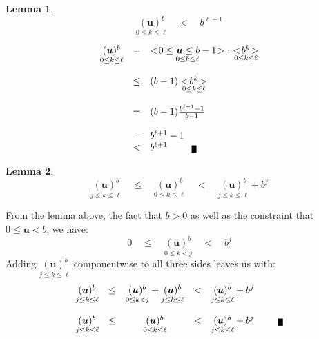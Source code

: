 \documentclass[twoside]{article}
\newcommand{\underseq}[2][u]{\ensuremath{\underset{#2}{<\!#1\!>}}}
\newcommand{\bradixp}[3][u]{\ensuremath{\underset{#2}{(\bm{#1})^{#3}}}}
\newtheorem{lemma}{Lemma}[section]
\newenvironment{proof}[1][Proof]{\begin{trivlist}
\item[\hskip \labelsep {\bfseries #1}]}{\end{trivlist}}
\newcommand{\qed}{\nobreak \ifvmode \relax \else
      \ifdim\lastskip<1.5em \hskip-\lastskip
      \hskip1.5em plus0em minus0.5em \fi \nobreak
      \vrule height0.5em width0.5em depth0.25em\fi}
\begin{document}
\begin{lemma}
\color{blue}
$$ \bradixp{0\le k\le\ell}{b}\quad <\quad b^{\ell+1} $$
\end{lemma}

\begin{proof}
$$ \begin{array}{rcl}
\bradixp{0\le k\le\ell}{b}
	& = &	\underseq[0\le\bm{u}\le b-1]{0\le k\le\ell}\cdot\underseq[b^k]{0\le k\le\ell}	\\
												\\
	& \le &	(b-1)\underseq[b^k]{0\le k\le\ell}						\\
												\\
	& = &	(b-1)\frac{b^{\ell+1}-1}{b-1}							\\
												\\
	& = &	b^{\ell+1}-1									\\
	& < &	b^{\ell+1}\quad\qed								\\
\end{array} $$
\end{proof}

\newpage

\begin{lemma}
\color{blue}
$$ \bradixp{j\le k\le\ell}{b}\quad\le\quad\bradixp{0\le k\le\ell}{b}\quad <\quad \bradixp{j\le k\le\ell}{b}+b^j $$
\end{lemma}

\begin{proof}
From the lemma above, the fact that $ b > 0 $ as well as the constraint that $ 0\le\bm{u} < b $, we have:
$$ 0\quad\le\quad\bradixp{0\le k < j}{b}\quad <\quad b^j $$
Adding $ \bradixp{j\le k\le\ell}{b} $ componentwise to all three sides leaves us with:
$$ \begin{array}{rrcrl}
\bradixp{j\le k\le\ell}{b} & \le & \bradixp{0\le k < j}{b}+\bradixp{j\le k\le\ell}{b} & < & \bradixp{j\le k\le\ell}{b}+b^j	\\
																\\
\bradixp{j\le k\le\ell}{b} & \le & \bradixp{0\le k\le\ell}{b} & < & \bradixp{j\le k\le\ell}{b}+b^j\quad\qed			\\
\end{array} $$
\end{proof}
\end{document}
